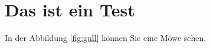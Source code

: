 \Blinddocument

\chapter{Das ist ein Test}

In der Abbildung \ref{fig:gull} können Sie eine Möwe sehen.


\Blinddocument
